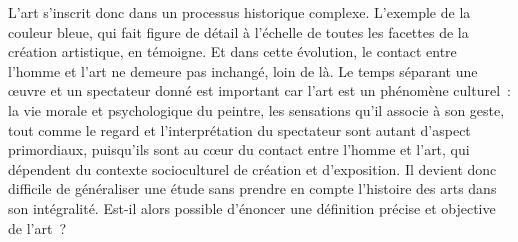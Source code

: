 
	L’art s’inscrit donc dans un processus historique complexe. L’exemple de la couleur bleue, qui fait figure de détail à l’échelle de toutes les facettes de la création artistique, en témoigne. Et dans cette évolution, le contact entre l’homme et l’art ne demeure pas inchangé, loin de là. Le temps séparant une œuvre et un spectateur donné est important car l’art est un phénomène culturel : la vie morale et psychologique du peintre, les sensations qu’il associe à son geste, tout comme le regard et l’interprétation du spectateur sont autant d’aspect primordiaux, puisqu’ils sont au cœur du contact entre l’homme et l’art, qui dépendent du contexte socioculturel  de création et d’exposition. Il devient donc difficile de généraliser une étude sans prendre en compte l’histoire des arts dans son intégralité. Est-il alors possible d’énoncer une définition précise et objective de l’art ?
